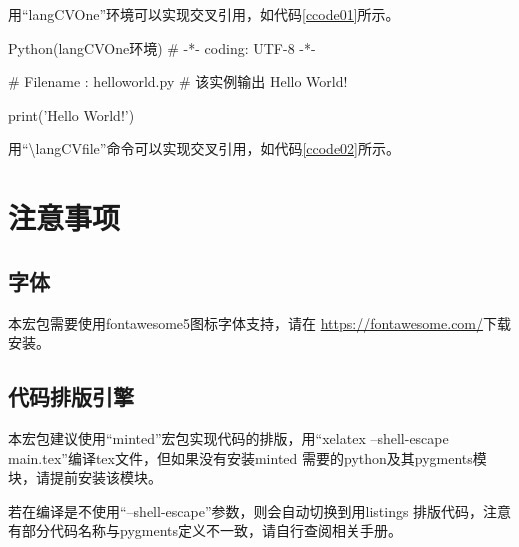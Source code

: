 \documentclass{ctexart}
\newcommand{\qtmark}[1]{``#1''}
\begin{document}

用\qtmark{langCVOne}环境可以实现交叉引用，如代码\ref{ccode01}所示。
\begin{langCVOne}[python][ccode01][Python]{Python(langCVOne环境)}
  # -*- coding: UTF-8 -*-

  # Filename : helloworld.py
  # 该实例输出 Hello World!

  print('Hello World!')
\end{langCVOne}

用\qtmark{\textbackslash langCVfile}命令可以实现交叉引用，如代码\ref{ccode02}所示。


\section{注意事项}
\subsection{字体}
本宏包需要使用fontawesome5图标字体支持，请在
\url{https://fontawesome.com/}下载安装。
\subsection{代码排版引擎}
本宏包建议使用\qtmark{minted}宏包实现代码的排版，用\qtmark{xelatex
  --shell-escape main.tex}编译tex文件，但如果没有安装minted
需要的python及其pygments模块，请提前安装该模块。

若在编译是不使用\qtmark{--shell-escape}参数，则会自动切换到用listings
排版代码，注意有部分代码名称与pygments定义不一致，请自行查阅相关手册。
\end{document}
